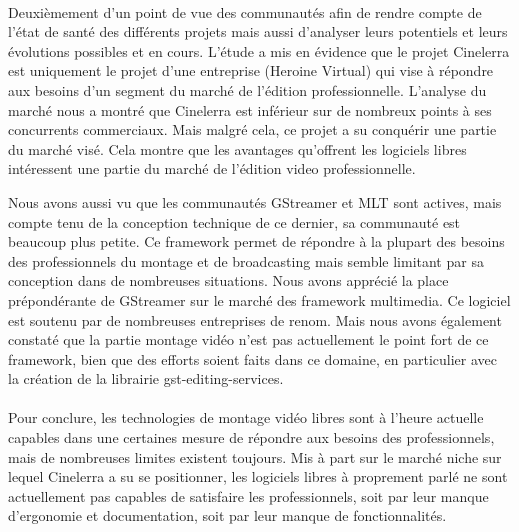 \paragraph{}

Deuxièmement d'un point de vue des communautés afin de rendre compte
de l'état de santé des différents projets mais aussi d'analyser leurs
potentiels et leurs évolutions possibles et en cours.
L'étude a mis en évidence que le projet Cinelerra est
uniquement le projet d'une entreprise (Heroine Virtual) qui vise
à répondre aux besoins d'un segment du marché de l'édition
professionnelle. L'analyse du marché nous a montré que Cinelerra
est inférieur sur de nombreux points à ses concurrents commerciaux.
Mais malgré cela, ce projet a su conquérir une partie du marché
visé. Cela montre que les avantages qu'offrent les logiciels libres
intéressent une partie du marché de l'édition video professionnelle.


Nous avons aussi vu que les communautés GStreamer et MLT sont actives,
mais compte tenu de la conception technique de ce dernier, sa communauté
est beaucoup plus petite. Ce framework permet de répondre à la plupart
des besoins des professionnels du montage et de broadcasting mais semble
limitant par sa conception dans de nombreuses situations.  Nous avons
apprécié la place prépondérante de GStreamer sur le marché des
framework multimedia. Ce logiciel est soutenu par de nombreuses entreprises
de renom. Mais nous avons également constaté que la partie montage vidéo
n'est pas actuellement le point fort de ce framework, bien que des
efforts soient faits dans ce domaine, en particulier avec la création de
la librairie gst-editing-services.

\paragraph{}

Pour conclure, les technologies de montage vidéo libres sont à l'heure
actuelle capables dans une certaines mesure de répondre aux besoins des
professionnels, mais de nombreuses limites existent toujours. Mis à part
sur le marché niche sur lequel Cinelerra a su se positionner, les
logiciels libres à proprement parlé ne sont actuellement pas capables
de satisfaire les professionnels, soit par leur manque d'ergonomie et
documentation, soit par leur manque de fonctionnalités.

\paragraph{}

